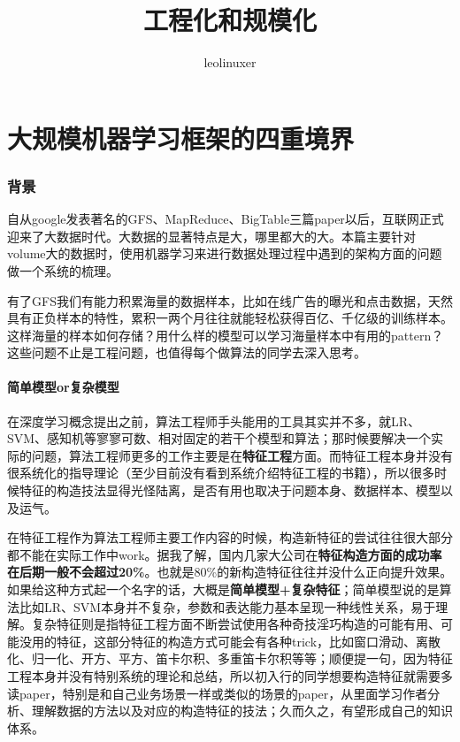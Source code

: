 \documentclass[12pt]{article}
\title{工程化和规模化}
\author{leolinuxer}
\begin{document}
\maketitle
\tableofcontents

\part{大规模机器学习框架的四重境界\cite{Four_Levels_Of_Large_Scale_Machine_Learning}}
\section{背景}
自从google发表著名的GFS、MapReduce、BigTable三篇paper以后，互联网正式迎来了大数据时代。大数据的显著特点是大，哪里都大的大。本篇主要针对volume大的数据时，使用机器学习来进行数据处理过程中遇到的架构方面的问题做一个系统的梳理。

有了GFS我们有能力积累海量的数据样本，比如在线广告的曝光和点击数据，天然具有正负样本的特性，累积一两个月往往就能轻松获得百亿、千亿级的训练样本。这样海量的样本如何存储？用什么样的模型可以学习海量样本中有用的pattern？这些问题不止是工程问题，也值得每个做算法的同学去深入思考。


\subsection{简单模型or复杂模型}
在深度学习概念提出之前，算法工程师手头能用的工具其实并不多，就LR、SVM、感知机等寥寥可数、相对固定的若干个模型和算法；那时候要解决一个实际的问题，算法工程师更多的工作主要是在\textbf{特征工程}方面。而特征工程本身并没有很系统化的指导理论（至少目前没有看到系统介绍特征工程的书籍），所以很多时候特征的构造技法显得光怪陆离，是否有用也取决于问题本身、数据样本、模型以及运气。

在特征工程作为算法工程师主要工作内容的时候，构造新特征的尝试往往很大部分都不能在实际工作中work。据我了解，国内几家大公司在\textbf{特征构造方面的成功率在后期一般不会超过20\%}。也就是80\%的新构造特征往往并没什么正向提升效果。如果给这种方式起一个名字的话，大概是\textbf{简单模型+复杂特征}；简单模型说的是算法比如LR、SVM本身并不复杂，参数和表达能力基本呈现一种线性关系，易于理解。复杂特征则是指特征工程方面不断尝试使用各种奇技淫巧构造的可能有用、可能没用的特征，这部分特征的构造方式可能会有各种trick，比如窗口滑动、离散化、归一化、开方、平方、笛卡尔积、多重笛卡尔积等等；顺便提一句，因为特征工程本身并没有特别系统的理论和总结，所以初入行的同学想要构造特征就需要多读paper，特别是和自己业务场景一样或类似的场景的paper，从里面学习作者分析、理解数据的方法以及对应的构造特征的技法；久而久之，有望形成自己的知识体系。
\end{document}

